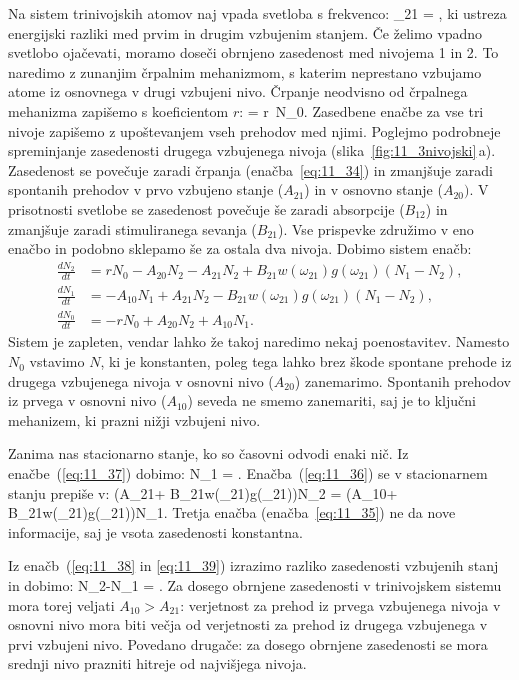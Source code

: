 Na sistem trinivojskih atomov naj vpada svetloba s frekvenco:
\beq
\omega_{21} = ,
\label{eq:11_33}
\eeq
ki ustreza energijski razliki med prvim in drugim vzbujenim stanjem.  Če želimo
vpadno svetlobo ojačevati, moramo doseči obrnjeno zasedenost med nivojema 1 in 2.
To naredimo z zunanjim črpalnim mehanizmom, s katerim neprestano vzbujamo atome 
iz osnovnega v drugi vzbujeni nivo. Črpanje neodvisno od črpalnega mehanizma
zapišemo s koeficientom $r$:
\beq
{} = r\, N_0.
\label{eq:11_34}
\eeq
Zasedbene enačbe za vse tri nivoje zapišemo z upoštevanjem vseh prehodov med njimi. 
Poglejmo podrobneje spreminjanje zasedenosti drugega vzbujenega nivoja 
(slika~\ref{fig:11_3nivojski}\,a). Zasedenost
se povečuje zaradi črpanja (enačba~\ref{eq:11_34}) in zmanjšuje zaradi spontanih
prehodov v prvo vzbujeno stanje ($A_{21}$) in v osnovno stanje ($A_{20})$. V prisotnosti
svetlobe se zasedenost povečuje še zaradi absorpcije ($B_{12}$) in zmanjšuje
zaradi stimuliranega sevanja ($B_{21}$). Vse prispevke združimo v eno enačbo in 
podobno sklepamo še za ostala dva nivoja. Dobimo sistem enačb:
\begin{align}
\frac{dN_2}{dt} &= rN_0 - A_{20}N_2 - A_{21}N_2 + B_{21}w(\omega_{21})g(\omega_{21}) 
(N_1-N_2),\label{eq:11_35}\\
\frac{dN_1}{dt} &= - A_{10}N_1 + A_{21}N_2 - B_{21}w(\omega_{21})g(\omega_{21}) 
(N_1-N_2),\label{eq:11_36}\\
\frac{dN_0}{dt} &= - rN_0 + A_{20}N_2 + A_{10}N_1.\label{eq:11_37}
\end{align}
Sistem je zapleten, vendar lahko že takoj naredimo nekaj poenostavitev. Namesto
$N_0$ vstavimo $N$, ki je konstanten, poleg tega lahko brez škode spontane prehode
iz drugega vzbujenega nivoja v osnovni nivo ($A_{20}$) zanemarimo. Spontanih prehodov
iz prvega v osnovni nivo ($A_{10}$) seveda ne smemo zanemariti, saj je to ključni
mehanizem, ki prazni nižji vzbujeni nivo.

Zanima nas stacionarno stanje, ko so časovni odvodi enaki nič. 
Iz enačbe~(\ref{eq:11_37}) dobimo:
\beq
N_1 =  \approx {}.
\label{eq:11_38}
\eeq
Enačba~(\ref{eq:11_36}) se v stacionarnem stanju prepiše v:
\beq
\left(A_{21}+ B_{21}w(\omega_{21})g(\omega_{21})\right)N_2 = 
\left(A_{10}+ B_{21}w(\omega_{21})g(\omega_{21})\right)N_1.
\label{eq:11_39}
\eeq
Tretja enačba (enačba~\ref{eq:11_35}) ne da nove informacije, 
saj je vsota zasedenosti konstantna.

Iz enačb~(\ref{eq:11_38} in \ref{eq:11_39}) izrazimo razliko 
zasedenosti vzbujenih stanj in dobimo:
\beq
N_2-N_1 = 
\cdot {}.
\label{eq:11_40}
\eeq
Za dosego obrnjene zasedenosti v trinivojskem sistemu mora torej 
veljati $A_{10}>A_{21}$: verjetnost za prehod iz prvega vzbujenega nivoja v 
osnovni nivo mora biti večja od verjetnosti za prehod iz 
drugega vzbujenega v prvi vzbujeni nivo. Povedano drugače: 
za dosego obrnjene zasedenosti se mora srednji nivo 
prazniti hitreje od najvišjega nivoja. 

